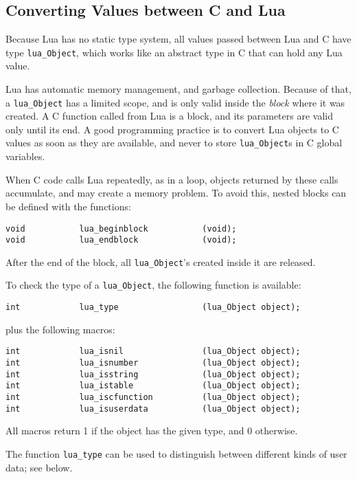 \subsection{Converting Values between C and Lua} \label{valuesCLua}
Because Lua has no static type system,
all values passed between Lua and C have type
\verb'lua_Object',
which works like an abstract type in C that can hold any Lua value.

Lua has automatic memory management, and garbage collection.
Because of that, a \verb'lua_Object' has a limited scope,
and is only valid inside the {\em block\/} where it was created.
A C function called from Lua is a block,
and its parameters are valid only until its end.
A good programming practice is to convert Lua objects to C values
as soon as they are available,
and never to store \verb'lua_Object's in C global variables.

When C code calls Lua repeatedly, as in a loop,
objects returned by these calls accumulate,
and may create a memory problem.
To avoid this,
nested blocks can be defined with the functions:
\begin{verbatim}
void           lua_beginblock           (void);
void           lua_endblock             (void);
\end{verbatim}
After the end of the block,
all \verb'lua_Object''s created inside it are released.

To check the type of a \verb'lua_Object',
the following function is available:
\begin{verbatim}
int            lua_type                 (lua_Object object);
\end{verbatim}
plus the following macros:
\begin{verbatim}
int            lua_isnil                (lua_Object object);
int            lua_isnumber             (lua_Object object);
int            lua_isstring             (lua_Object object);
int            lua_istable              (lua_Object object);
int            lua_iscfunction          (lua_Object object);
int            lua_isuserdata           (lua_Object object);
\end{verbatim}
All macros return 1 if the object has the given type,
and 0 otherwise.

The function \verb'lua_type' can be used to distinguish between
different kinds of user data; see below.

